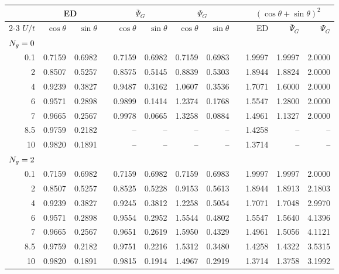 \begin{tabular}{r rr c rr rr c rrr}
\toprule
 & \multicolumn{2}{c}{ED} & & \multicolumn{2}{c}{$\bar\Psi_G$} & \multicolumn{2}{c}{$\Psi_G$} & & \multicolumn{3}{c}{$(\cos\theta+\sin\theta)^2$}\\
\cmidrule{2-3}\cmidrule{5-8}\cmidrule{10-12}
$U/t$ & $\cos\theta$ & $\sin\theta$ & & $\cos\theta$ & $\sin\theta$ & $\cos\theta$ & $\sin\theta$ & & ED & $\bar\Psi_G$ & $\Psi_G$\\
\midrule
\multicolumn{12}{l}{$N_{g}=0$}\\
0.1 & 0.7159 & 0.6982 &  & 0.7159 & 0.6982 & 0.7159 & 0.6983 &  & 1.9997 & 1.9997 & 2.0000\\
2 & 0.8507 & 0.5257 &  & 0.8575 & 0.5145 & 0.8839 & 0.5303 &  & 1.8944 & 1.8824 & 2.0000\\
4 & 0.9239 & 0.3827 &  & 0.9487 & 0.3162 & 1.0607 & 0.3536 &  & 1.7071 & 1.6000 & 2.0000\\
6 & 0.9571 & 0.2898 &  & 0.9899 & 0.1414 & 1.2374 & 0.1768 &  & 1.5547 & 1.2800 & 2.0000\\
7 & 0.9665 & 0.2567 &  & 0.9978 & 0.0665 & 1.3258 & 0.0884 &  & 1.4961 & 1.1327 & 2.0000\\
8.5 & 0.9759 & 0.2182 &  & -- & -- & -- & -- &  & 1.4258 & -- & --\\
10 & 0.9820 & 0.1891 &  & -- & -- & -- & -- &  & 1.3714 & -- & --\\
\midrule
\multicolumn{12}{l}{$N_{g}=2$}\\
0.1 & 0.7159 & 0.6982 &  & 0.7159 & 0.6982 & 0.7159 & 0.6983 &  & 1.9997 & 1.9997 & 2.0000\\
2 & 0.8507 & 0.5257 &  & 0.8525 & 0.5228 & 0.9153 & 0.5613 &  & 1.8944 & 1.8913 & 2.1803\\
4 & 0.9239 & 0.3827 &  & 0.9245 & 0.3812 & 1.2258 & 0.5054 &  & 1.7071 & 1.7048 & 2.9970\\
6 & 0.9571 & 0.2898 &  & 0.9554 & 0.2952 & 1.5544 & 0.4802 &  & 1.5547 & 1.5640 & 4.1396\\
7 & 0.9665 & 0.2567 &  & 0.9651 & 0.2619 & 1.5950 & 0.4329 &  & 1.4961 & 1.5056 & 4.1121\\
8.5 & 0.9759 & 0.2182 &  & 0.9751 & 0.2216 & 1.5312 & 0.3480 &  & 1.4258 & 1.4322 & 3.5315\\
10 & 0.9820 & 0.1891 &  & 0.9815 & 0.1914 & 1.4967 & 0.2919 &  & 1.3714 & 1.3758 & 3.1992\\
\bottomrule
\end{tabular}
